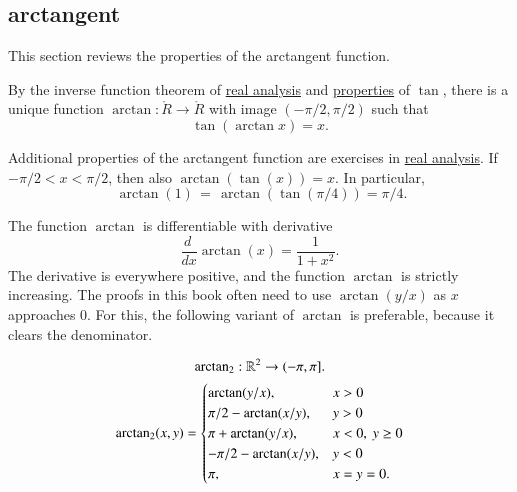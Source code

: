 \subsection{arctangent}

This section reviews the properties of the arctangent function.  

\begin{definition}[arctangent]\label{def:arctan}
  By the inverse function theorem of \hyperref[back:analysis]{real
    analysis} and \hyperref[lemma:tan-monotone]{properties} of $\tan$,
  there is a unique function $\arctan:\ring{R}\to\ring{R}$ with image
  $(-\pi/2,\pi/2)$ such that
\begin{equation}\label{eqn:tanarctan}\tan(\arctan x) =x.\end{equation}
%
\end{definition}

Additional properties of the arctangent function are exercises in
\hyperref[back:analysis]{real analysis}.  If $-\pi/2 < x < \pi/2$,
then also $\arctan(\tan(x)) = x$. In particular,%
\begin{equation}\label{eqn:arctan-1}\
\arctan(1) \hyperref[lemma:tan-pi4]{\,=\,} \arctan(\tan(\pi/4)) = \pi/4.
\end{equation}


The function $\arctan$ is differentiable with derivative%
\begin{equation}\label{eqn:deriv-tan}\frac{d\phantom{~}} {dx} \arctan(x) = \frac{1}{1 +
    x^2}.\end{equation}
The derivative is everywhere positive, and the function $\arctan$ is
strictly increasing.   \mar{\guid{LQCXGZX} increasing}
%
The proofs in this book often need to use $\arctan(y/x)$ as  $x$ approaches $0$.
For this, the following variant of $\arctan$ is preferable, because it clears the denominator.


\begin{definition}[$\atn$]\label{def:atn}
\begin{displaymath}
{\operatorname{arctan\ensuremath{_2}}}: \mathbb{R}^2 \to (-\pi,\pi].
\end{displaymath}
\begin{displaymath}
{\operatorname{arctan\ensuremath{_2}}}(x,y) = \begin{cases}
\arctan(y/x), & x > 0\\
\pi/2- \arctan(x/y), & y > 0 \\
\pi + \arctan(y/x), & x< 0,\  y\ge 0\\
-\pi/2- \arctan(x/y), & y< 0 \\
\pi, & x= y=0.\\
\end{cases}
\end{displaymath}
\end{definition}
%
%


